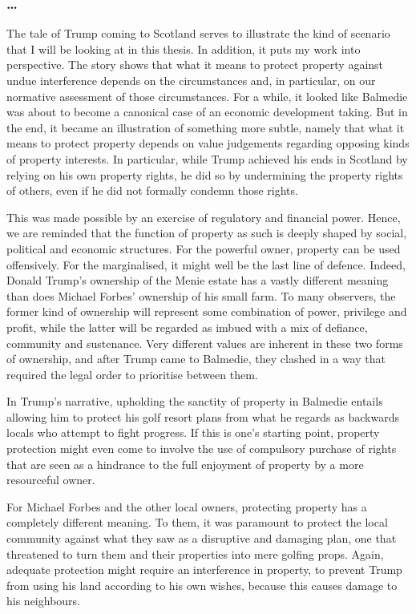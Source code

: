 \subsubsection*{\ldots}

The tale of Trump coming to Scotland serves to illustrate the kind of scenario that I will be looking at in this thesis. In addition, it puts my work into perspective. The story shows that what it means to protect property against undue interference depends on the circumstances and, in particular, on our normative assessment of those circumstances. For a while, it looked like Balmedie was about to become a canonical case of an economic development taking. But in the end, it became an illustration of something more subtle, namely that what it means to protect property depends on value judgements regarding opposing kinds of property interests. In particular, while Trump achieved his ends in Scotland by relying on his own property rights, he did so by undermining the property rights of others, even if he did not formally condemn those rights.

This was made possible by an exercise of regulatory and financial power. Hence, we are reminded that the function of property as such is deeply shaped by social, political and economic structures. For the powerful owner, property can be used offensively. For the marginalised, it might well be the last line of defence. Indeed, Donald Trump's ownership of the Menie estate has a vastly different meaning than does Michael Forbes' ownership of his small farm. To many observers, the former kind of ownership will represent some combination of power, privilege and profit, while the latter will be regarded as imbued with a mix of defiance, community and sustenance. Very different values are inherent in these two forms of ownership, and after Trump came to Balmedie, they clashed in a way that required the legal order to prioritise between them.

In Trump's narrative, upholding the sanctity of property in Balmedie entails allowing him to protect his golf resort plans from what he regards as backwards locals who attempt to fight progress. If this is one's starting point, property protection might even come to involve the use of compulsory purchase of rights that are seen as a hindrance to the full enjoyment of property by a more resourceful owner. 

For Michael Forbes and the other local owners, protecting property has a completely different meaning. To them, it was paramount to protect the local community against what they saw as a disruptive and damaging plan, one that threatened to turn them and their properties into mere golfing props. Again, adequate protection might require an interference in property, to prevent Trump from using his land according to his own wishes, because this causes damage to his neighbours. 

